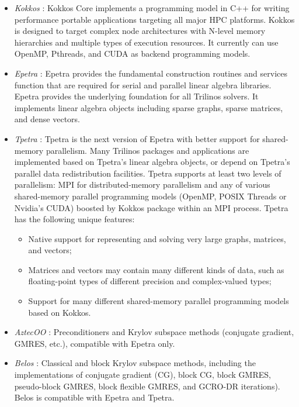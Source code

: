 {\begin{itemize}
	\item \textit{Kokkos} \cite{edwards2014kokkos}: Kokkos Core implements a programming model in C++ for writing performance portable applications targeting all major HPC platforms. Kokkos is designed to target complex node architectures with N-level memory hierarchies and multiple types of execution resources. It currently can use OpenMP, Pthreads, and CUDA as backend programming models.
	
	\item \textit{Epetra} \cite{heroux2005epetra}: Epetra provides the fundamental construction routines and services function that are required for serial and parallel linear algebra libraries. Epetra provides the underlying foundation for all Trilinos solvers. It implements linear algebra objects including sparse graphs, sparse matrices, and dense vectors.  
	
	\item \textit{Tpetra} \cite{baker2012tpetra}: Tpetra is the next version of Epetra with better support for shared-memory parallelism. Many Trilinos packages and applications  are implemented based on Tpetra’s linear algebra objects, or depend on Tpetra’s parallel data redistribution facilities. Tpetra supports at least two levels of parallelism: MPI  for distributed-memory parallelism and any of various shared-memory parallel programming models (OpenMP, POSIX Threads or Nvidia’s CUDA) boosted by Kokkos package within an MPI process.  Tpetra has the following unique features:
	
	\begin{itemize}
		\item Native support for representing and solving very large graphs, matrices, and vectors;
		\item Matrices and vectors may contain many different kinds of data, such as floating-point types of different precision and complex-valued types;
		\item Support for many different shared-memory parallel programming models based on Kokkos.
	\end{itemize}
	
	\item \textit{AztecOO} \cite{heroux2004aztecoo}: Preconditioners and Krylov subspace methods (conjugate gradient, GMRES, etc.), compatible with Epetra only.
	
	\item \textit{Belos} \cite{bavier2012amesos2}: Classical and block Krylov subspace methods, including the implementations of conjugate gradient (CG), block CG, block GMRES, pseudo-block GMRES, block flexible GMRES, and GCRO-DR iterations). Belos is compatible with Epetra and Tpetra.
	

\end{itemize}}
